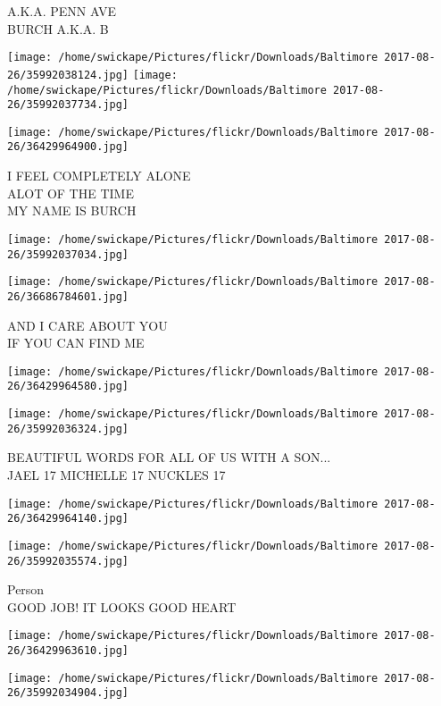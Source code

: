 \documentclass[10pt,letterpaper]{article}
\begin{document}
A.K.A. PENN AVE\\
BURCH A.K.A. B
\pagebreak

\texttt{[image: /home/swickape/Pictures/flickr/Downloads/Baltimore 2017-08-26/35992038124.jpg]}
\texttt{[image: /home/swickape/Pictures/flickr/Downloads/Baltimore 2017-08-26/35992037734.jpg]}

\vspace{0.25in}
\texttt{[image: /home/swickape/Pictures/flickr/Downloads/Baltimore 2017-08-26/36429964900.jpg]}

I FEEL COMPLETELY ALONE\\
ALOT OF THE TIME\\
MY NAME IS BURCH
\pagebreak

\texttt{[image: /home/swickape/Pictures/flickr/Downloads/Baltimore 2017-08-26/35992037034.jpg]}

\vspace{0.25in}
\texttt{[image: /home/swickape/Pictures/flickr/Downloads/Baltimore 2017-08-26/36686784601.jpg]}

AND I CARE ABOUT YOU\\
IF YOU CAN FIND ME
\pagebreak

\texttt{[image: /home/swickape/Pictures/flickr/Downloads/Baltimore 2017-08-26/36429964580.jpg]}

\vspace{0.25in}
\texttt{[image: /home/swickape/Pictures/flickr/Downloads/Baltimore 2017-08-26/35992036324.jpg]}

BEAUTIFUL WORDS FOR ALL OF US WITH A SON...\\
JAEL 17 MICHELLE 17 NUCKLES 17
\pagebreak

\texttt{[image: /home/swickape/Pictures/flickr/Downloads/Baltimore 2017-08-26/36429964140.jpg]}

\vspace{0.25in}
\texttt{[image: /home/swickape/Pictures/flickr/Downloads/Baltimore 2017-08-26/35992035574.jpg]}

Person\\
GOOD JOB!  IT LOOKS GOOD HEART
\pagebreak

\texttt{[image: /home/swickape/Pictures/flickr/Downloads/Baltimore 2017-08-26/36429963610.jpg]}

\vspace{0.25in}
\texttt{[image: /home/swickape/Pictures/flickr/Downloads/Baltimore 2017-08-26/35992034904.jpg]}
\end{document}
